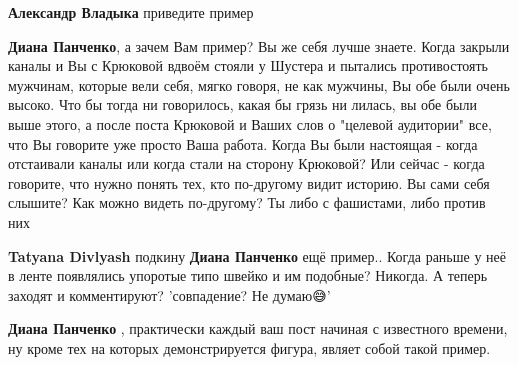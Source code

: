 \begin{itemize}
\begin{itemize}
 
\textbf{Александр Владыка} приведите пример

 
\textbf{Диана Панченко}, а зачем Вам пример? Вы же себя лучше знаете. Когда
закрыли каналы и Вы с Крюковой вдвоём стояли у Шустера и пытались противостоять
мужчинам, которые вели себя, мягко говоря, не как мужчины, Вы обе были очень
высоко. Что бы тогда ни говорилось, какая бы грязь ни лилась, вы обе были выше
этого, а после поста Крюковой и Ваших слов о "целевой аудитории" все, что Вы
говорите уже просто Ваша работа. Когда Вы были настоящая - когда отстаивали
каналы или когда стали на сторону Крюковой? Или сейчас - когда говорите, что
нужно понять тех, кто по-другому видит историю. Вы сами себя слышите? Как можно
видеть по-другому? Ты либо с фашистами, либо против них

 
\textbf{Tatyana Divlyash} подкину \textbf{Диана Панченко} ещё пример.. Когда раньше у
неё в ленте появлялись упоротые типо швейко и им подобные? Никогда. А теперь
заходят и комментируют? 'совпадение? Не думаю😅'

 
\textbf{Диана Панченко} , практически каждый ваш пост начиная с известного
времени, ну кроме тех на которых демонстрируется фигура, являет собой такой
пример.

 

\end{itemize}
\end{itemize}
